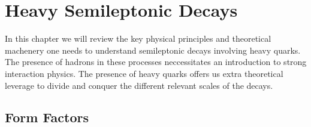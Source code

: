 \chapter{Heavy Semileptonic Decays}
\label{chap:semileptonic}

In this chapter we will review the key physical principles and theoretical machenery one needs to understand semileptonic decays involving heavy quarks. The presence of hadrons in these processes neccessitates an introduction to strong interaction physics. The presence of heavy quarks offers us extra theoretical leverage to divide and conquer the different relevant scales of the decays.

\section{Form Factors}

